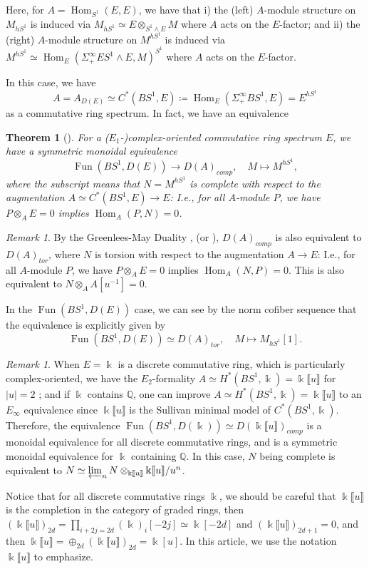 \documentclass[11pt]{amsart}
\numberwithin{equation}{section}
\theoremstyle{plain}
\newtheorem{Thm}{Theorem}[section]
\theoremstyle{definition}
\theoremstyle{remark}
\newtheorem{RMK}[rmk]{Remark}
\newcommand{\bQ} { {\mathbb{Q}}}
\newcommand{\fpw}[1]{{\llbracket #1\rrbracket}}
\newcommand\Fun{\operatorname{Fun}}
\newcommand\Hom{\operatorname{Hom}}
\begin{document}
Here, for $A=\Hom_{S^1}(E,E)$, we have that i) the (left) $A$-module structure on $M_{hS^1}$ is induced via $M_{hS^1}\simeq E\otimes_{S^1\wedge E} M$ where $A$ acts on the $E$-factor; and ii) the (right) $A$-module structure on $M^{hS^1}$ is induced via $M^{hS^1}\simeq \Hom_E(\Sigma^\infty_+ES^1\wedge E, M)^{S^1}$ where $A$ acts on the $E$-factor.

In this case,  we have
\[A=A_{D(E)}\simeq C^*(BS^1,E)\coloneqq \Hom_E(\Sigma^\infty_+BS^1,E) = E^{hS^1}\]
as a commutative ring spectrum. In fact, we have an equivalence
\begin{Thm}[{\cite[Theorem 7.29, 7.43]{MNN_nilpotence_equivariant_homotopy}}]\label{thm: fixed point as a monoidal functor}For a ($E_1$-)complex-oriented commutative ring spectrum $E$, we have a symmetric monoidal equivalence
\[\Fun(BS^1,D(E))\to D(A)_{comp},\quad M\mapsto M^{hS^1},\]
where the subscript means that $N=M^{hS^1}$ is complete with respect to the augmentation $A\simeq C^*(BS^1,E)\to E$: I.e., for all $A$-module $P$, we have $P\otimes_A E =0$ implies $\Hom_{A}(P,N)=0$.
\end{Thm}
\begin{RMK}By the Greenlees-May Duality \cite{GreenleesMay1995}, (or \cite[Proposition 7.2.3.23~(5)]{HA}), $D(A)_{comp}$ is also equivalent to $D(A)_{tor}$, where $N$ is torsion with respect to the augmentation $A \to E$: I.e., for all $A$-module $P$, we have $P\otimes_A E =0$ implies $\Hom_{A}(N,P)=0$.  This is also equivalent to $N \otimes_A A[u^{-1}]=0$.

In the $\Fun(BS^1,D(E))$ case, we can see by the norm cofiber sequence that the equivalence is explicitly given by
\[\Fun(BS^1,D(E))\simeq D(A)_{tor},\quad M\mapsto M_{hS^1}[1].\]
\end{RMK}

\begin{RMK}\label{remark: formality for discrete ring}When $E=\Bbbk$ is a discrete commutative ring, which is particularly complex-oriented, we have the $E_2$-formality $A\simeq H^*(BS^1,\Bbbk)= \Bbbk\fpw{u}$ for $|u|=2$ \cite{Franz_E2formality,Horel_E2formality}; and if $\Bbbk$ contains $\bQ$, one can improve $A\simeq H^*(BS^1,\Bbbk)=\Bbbk\fpw{u}$ to an $E_\infty$ equivalence since $\Bbbk\fpw{u}$ is the Sullivan minimal model of $C^*(BS^1,\Bbbk)$. Therefore, the equivalence $\Fun(BS^1, D(\Bbbk))\simeq D(\Bbbk\fpw{u})_{comp}$ is a monoidal equivalence for all discrete commutative rings, and is a symmetric monoidal equivalence for $\Bbbk$ containing $\bQ$. In this case, $N$ being complete is equivalent to $N\simeq \varprojlim_n N\otimes_{\Bbbk\fpw{u}} \Bbbk\fpw{u}/u^n$. 

Notice that for all discrete commutative rings $\Bbbk$, we should be careful that $\Bbbk\fpw{u}$ is the completion in the category of graded rings, then $(\Bbbk\fpw{u})_{2d}=\prod_{i+2j=2d}(\Bbbk)_i[-2j]\simeq \Bbbk[-2d]$ and $(\Bbbk\fpw{u})_{2d+1}=0$, and then  $\Bbbk\fpw{u}=\oplus_{2d}(\Bbbk\fpw{u})_{2d}=\Bbbk[u]$. In this article, we use the notation $\Bbbk\fpw{u}$ to emphasize.
\end{RMK}
\end{document}
